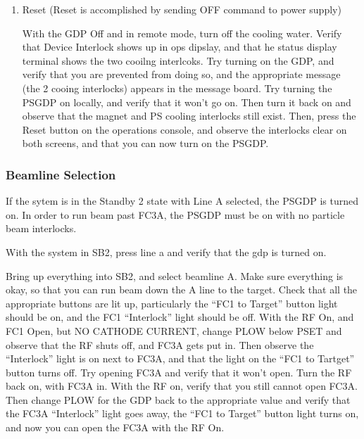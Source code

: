 \documentclass[11pt]{book}		%
\begin{document}
\begin{enumerate}
\color{black}


 \item Reset (Reset is accomplished by sending OFF command to power supply)

\color{red}

With the GDP Off and in remote mode, turn off the cooling water. Verify that Device Interlock shows up in ops dipslay, and that he status display terminal shows the two cooilng interlcoks. Try turning on the GDP, and verify that you are prevented from doing so, and the appropriate message (the 2 cooing interlocks) appears in the message board. Try turning the PSGDP on locally, and verify that it won't go on. Then turn it back on and observe that the magnet and PS cooling interlocks still exist. Then, press the Reset button on the operations console, and observe the interlocks clear on both screens, and that you can now turn on the PSGDP.

\color{black}

\end{enumerate}


\subsubsection{Beamline Selection} \label{sect:cyc-equip-ctl-beamline-gdp-state-controls-polarity}

If the sytem is in the Standby 2 state with Line A selected, the PSGDP is turned on. In order to run beam past FC3A, the PSGDP must be on with no particle beam interlocks.

\color{red}

With the system in SB2, press line a and verify that the gdp is turned on.

Bring up everything into SB2, and select beamline A. Make sure everything is okay, so that you can run beam down the A line to the target. Check that all the appropriate buttons are lit up, particularly the ``FC1 to Target'' button light should be on, and the FC1 ``Interlock'' light should be off. With the RF On, and FC1 Open, but NO CATHODE CURRENT, change PLOW below PSET and observe that the RF shuts off, and FC3A gets put in. Then observe the ``Interlock'' light is on next to FC3A, and that the light on the ``FC1 to Tartget'' button turns off. Try opening FC3A and verify that it won't open. Turn the RF back on, with FC3A in. With the RF on, verify that you still cannot open FC3A. Then change PLOW for the GDP back to the appropriate value and verify that the FC3A ``Interlock'' light goes away, the ``FC1 to Target'' button light turns on, and now you can open the FC3A with the RF On.
\end{document}
